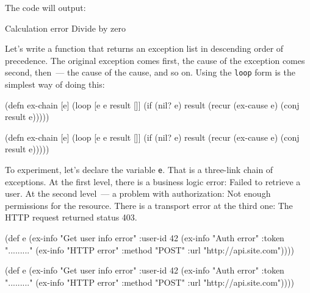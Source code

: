 \fi

\noindent
The code will output:

\begin{text}
Calculation error
Divide by zero
\end{text}

Let's write a function that returns an exception list in descending order of precedence. The original exception comes first, the cause of the exception comes second, then~--- the cause of the cause, and so on. Using the \verb|loop| form is the simplest way of doing this:


\ifx\DEVICETYPE\MOBILE

\begin{clojure}
(defn ex-chain [e]
  (loop [e e
         result []]
    (if (nil? e)
      result
      (recur (ex-cause e)
        (conj result e)))))
\end{clojure}

\else

\begin{clojure}
(defn ex-chain [e]
  (loop [e e
         result []]
    (if (nil? e)
      result
      (recur (ex-cause e) (conj result e)))))
\end{clojure}

\fi

To experiment, let's declare the variable \verb|e|. That is a three-link chain of exceptions. At the first level, there is a business logic error: Failed to retrieve a user. At the second level~--- a problem with authorization: Not enough permissions for the resource. There is a transport error at the third one: The HTTP request returned status 403.

\label{e-sample}

\ifnarrow

\begin{clojure}
(def e
  (ex-info
   "Get user info error"
   {:user-id 42}
   (ex-info
     "Auth error"
     {:token "........."}
     (ex-info
       "HTTP error"
       {:method "POST"
        :url "http://api.site.com"}))))
\end{clojure}

\else

\begin{clojure}
(def e
  (ex-info
   "Get user info error"
   {:user-id 42}
   (ex-info "Auth error"
            {:token "........."}
            (ex-info "HTTP error"
                     {:method "POST"
                      :url "http://api.site.com"}))))
\end{clojure}

